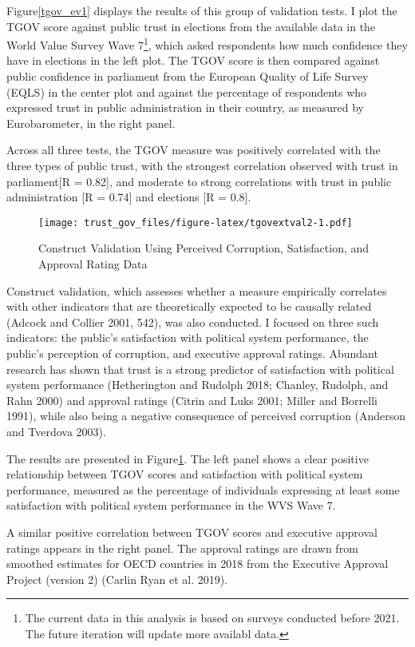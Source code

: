 \documentclass[
  12pt,
]{article}
\begin{document}
Figure\nobreakspace{}\ref{tgov_ev1} displays the results of this group of validation tests.
I plot the TGOV score against public trust in elections from the available data in the World Value Survey Wave 7\footnote{The current data in this analysis is based on surveys conducted before 2021. The future iteration will update more availabl data.}, which asked respondents how much confidence they have in elections in the left plot.
The TGOV score is then compared against public confidence in parliament from the European Quality of Life Survey (EQLS) in the center plot and against the percentage of respondents who expressed trust in public administration in their country, as measured by Eurobarometer, in the right panel.

Across all three tests, the TGOV measure was positively correlated with the three types of public trust, with the strongest correlation observed with trust in parliament{[}R = 0.82{]}, and moderate to strong correlations with trust in public administration {[}R = 0.74{]} and elections {[}R = 0.8{]}.

\begin{figure}
\centering
\texttt{[image: trust\_gov\_files/figure-latex/tgovextval2-1.pdf]}
\caption{\label{fig:tgovextval2}Construct Validation Using Perceived Corruption, Satisfaction, and Approval Rating Data \label{tgov_ev2}}
\end{figure}

Construct validation, which assesses whether a measure empirically correlates with other indicators that are theoretically expected to be causally related (Adcock and Collier 2001, 542), was also conducted.
I focused on three such indicators: the public's satisfaction with political system performance, the public's perception of corruption, and executive approval ratings.
Abundant research has shown that trust is a strong predictor of satisfaction with political system performance (Hetherington and Rudolph 2018; Chanley, Rudolph, and Rahn 2000) and approval ratings (Citrin and Luks 2001; Miller and Borrelli 1991), while also being a negative consequence of perceived corruption (Anderson and Tverdova 2003).

The results are presented in Figure\nobreakspace{}\ref{tgov_ev2}.
The left panel shows a clear positive relationship between TGOV scores and satisfaction with political system performance, measured as the percentage of individuals expressing at least some satisfaction with political system performance in the WVS Wave 7.

A similar positive correlation between TGOV scores and executive approval ratings appears in the right panel.
The approval ratings are drawn from smoothed estimates for OECD countries in 2018 from the Executive Approval Project (version 2) (Carlin Ryan et al. 2019).
\end{document}
